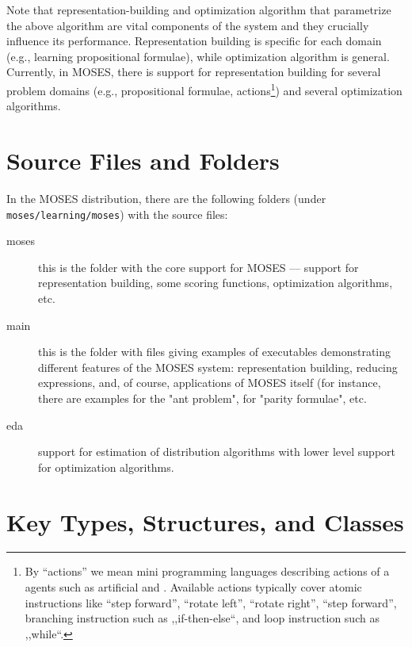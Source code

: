 \documentclass{article}
\begin{document}
Note that representation-building and optimization algorithm that parametrize
the above algorithm are vital components of the system and they crucially 
influence its performance.
Representation building is specific for each domain (e.g., learning 
propositional formulae), while optimization algorithm is general. 
Currently, in MOSES, there is support for representation building 
for several problem domains (e.g., propositional formulae, 
actions\footnote{By ``actions'' we mean mini programming languages
describing actions of a agents such as artificial and \cite{6}. Available
actions typically cover atomic instructions like ``step forward'',
``rotate left'', ``rotate right'', ``step forward'', 
branching instruction such as ,,if-then-else``,
and loop instruction such as ,,while``.}) 
and several optimization algorithms. 


\section{Source Files and Folders}

In the MOSES distribution, there are the following folders (under
\verb|moses/learning/moses|) with the source files:

\begin{description}
\item[moses] this is the folder with the core support for MOSES --- 
support for representation building, some scoring functions, optimization
algorithms, etc. 

\item[main] this is the folder with files giving examples of executables 
demonstrating different features of the MOSES system: representation building, 
reducing expressions, and, of course, applications of MOSES itself (for 
instance, there are examples for the "ant problem", for "parity formulae", etc.

\item[eda] support for estimation of distribution algorithms with lower
level support for optimization algorithms. 
\end{description}




\section{Key Types, Structures, and Classes}
\end{document}
